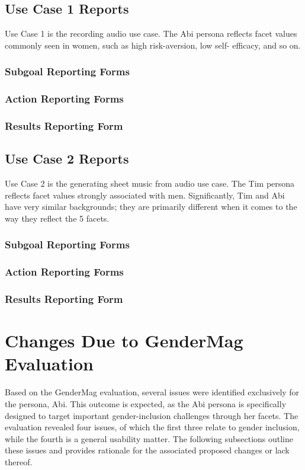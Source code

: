 \documentclass[12pt, titlepage]{article}
\begin{document}
\subsection{Use Case 1 Reports}
Use Case 1 is the recording audio use case. The Abi persona reflects
facet values commonly seen in women, such as high risk-aversion, low self-
efficacy, and so on.
\subsubsection{Subgoal Reporting Forms}

\subsubsection{Action Reporting Forms}

\subsubsection{Results Reporting Form}


\subsection{Use Case 2 Reports}
Use Case 2 is the generating sheet music from audio use case. The Tim persona reflects
facet values strongly associated with men. Significantly, Tim and Abi have very similar
backgrounds;
they are primarily different when it comes to the way they reflect the 5 facets.
\subsubsection{Subgoal Reporting Forms}

\subsubsection{Action Reporting Forms}

\subsubsection{Results Reporting Form}


\section{Changes Due to GenderMag Evaluation}
Based on the GenderMag evaluation, several issues were identified exclusively for the persona, Abi. This outcome is expected, 
as the Abi persona is specifically designed to target important gender-inclusion challenges through her facets. The evaluation 
revealed four issues, of which the first three relate to gender inclusion, while the fourth is a general usability
matter. The following subsections outline these issues and provides rationale for the associated proposed changes or lack thereof.
\end{document}
